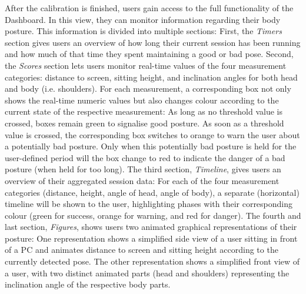 After the calibration is finished, users gain access to the full functionality of the Dashboard. In this view, they can monitor information regarding their body posture. This information is divided into multiple sections: First, the \textit{Timers} section gives users an overview of how long their current session has been running and how much of that time they spent maintaining a good or bad pose. Second, the \textit{Scores} section lets users monitor real-time values of the four measurement categories: distance to screen, sitting height, and inclination angles for both head and body (i.e. shoulders). For each measurement, a corresponding box not only shows the real-time numeric values but also changes colour according to the current state of the respective measurement: As long as no threshold value is crossed, boxes remain green to signalise good posture. As soon as a threshold value is crossed, the corresponding box switches to orange to warn the user about a potentially bad posture. Only when this potentially bad posture is held for the user-defined period will the box change to red to indicate the danger of a bad posture (when held for too long).
The third section, \textit{Timeline}, gives users an overview of their aggregated session data: For each of the four measurement categories (distance, height, angle of head, angle of body), a separate (horizontal) timeline will be shown to the user, highlighting phases with their corresponding colour (green for success, orange for warning, and red for danger). 
The fourth and last section, \textit{Figures}, shows users two animated graphical representations of their posture: One representation shows a simplified side view of a user sitting in front of a PC and animates distance to screen and sitting height according to the currently detected pose. The other representation shows a simplified front view of a user, with two distinct animated parts (head and shoulders) representing the inclination angle of the respective body parts.

